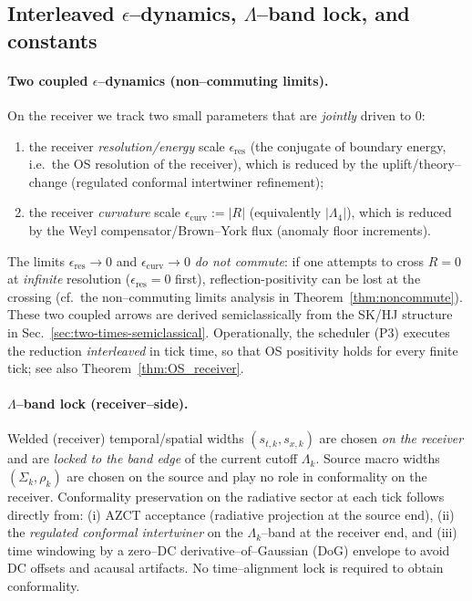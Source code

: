 \documentclass[10pt]{article}
\theoremstyle{definition}
\theoremstyle{plain}
\begin{document}
\subsection{\texorpdfstring{Interleaved $\epsilon$--dynamics, $\Lambda$--band lock, and constants}{Interleaved epsilon--dynamics, Lambda--band lock, and constants}}
\label{subsec:interleaved-eps}

\paragraph{Two coupled $\epsilon$--dynamics (non--commuting limits).}\label{par:uom-main-193}
On the receiver we track two small parameters that are \emph{jointly} driven to $0$:
\begin{enumerate}
  \item the receiver \emph{resolution/energy} scale
  $\epsilon_{\mathrm{res}}$ (the conjugate of boundary energy, i.e.\ the OS resolution of the receiver),
  which is reduced by the uplift/theory--change (regulated conformal intertwiner refinement);
  \item the receiver \emph{curvature} scale
  $\epsilon_{\mathrm{curv}}:=|R|$ (equivalently $|\Lambda_4|$), which is reduced by the Weyl compensator/Brown--York flux (anomaly floor increments).
\end{enumerate}
The limits $\epsilon_{\mathrm{res}}\to 0$ and $\epsilon_{\mathrm{curv}}\to 0$ \emph{do not commute}:
if one attempts to cross $R=0$ at \emph{infinite} resolution ($\epsilon_{\mathrm{res}}=0$ first), reflection-positivity can be lost at the crossing
(cf.\ the non--commuting limits analysis in Theorem~\ref{thm:noncommute}).
These two coupled arrows are derived semiclassically from the SK/HJ structure in Sec.~\ref{sec:two-times-semiclassical}.
Operationally, the scheduler (P3) executes the reduction \emph{interleaved} in tick time, so that OS positivity holds for every finite tick; see also Theorem~\ref{thm:OS_receiver}.

\paragraph{$\Lambda$--band lock (receiver--side).}\label{par:uom-main-194}
Welded (receiver) temporal/spatial widths $(s_{t,k},s_{x,k})$ are chosen \emph{on the receiver} and are \emph{locked to the band edge} of the current cutoff $\Lambda_k$.
Source macro widths $(\Sigma_k,\rho_k)$ are chosen on the source and play no role in conformality on the receiver.
Conformality preservation on the radiative sector at each tick follows directly from:
(i) AZCT acceptance (radiative projection at the source end),
(ii) the \emph{regulated conformal intertwiner} on the $\Lambda_k$--band at the receiver end,
and (iii) time windowing by a zero--DC derivative--of--Gaussian (DoG) envelope to avoid DC offsets and acausal artifacts.
No time--alignment lock is required to obtain conformality.
\end{document}

